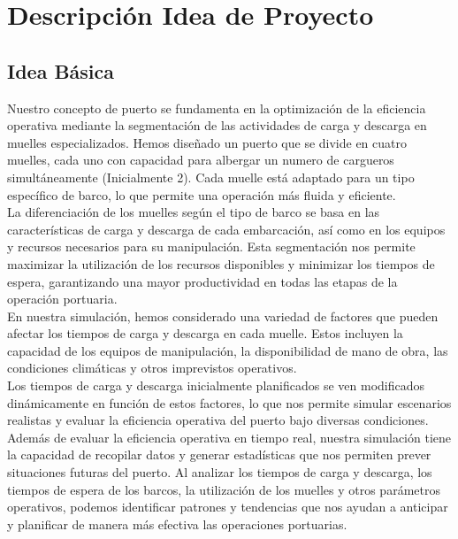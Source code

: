 \documentclass[12pt]{article}
\begin{document}
\begin{center}
   \renewcommand{\contentsname}{Indice de Contenidos}
    \tableofcontents 
\end{center}

\pagebreak


\section{Descripción Idea de Proyecto}
       \subsection{Idea Básica}
        Nuestro concepto de puerto se fundamenta en la optimización de la eficiencia operativa mediante la segmentación de las actividades de carga y descarga en muelles especializados. Hemos diseñado un puerto que se divide en cuatro muelles, cada uno con capacidad para albergar un numero de cargueros simultáneamente (Inicialmente 2). Cada muelle está adaptado para un tipo específico de barco, lo que permite una operación más fluida y eficiente.\\

        La diferenciación de los muelles según el tipo de barco se basa en las características de carga y descarga de cada embarcación, así como en los equipos y recursos necesarios para su manipulación. Esta segmentación nos permite maximizar la utilización de los recursos disponibles y minimizar los tiempos de espera, garantizando una mayor productividad en todas las etapas de la operación portuaria.\\

        En nuestra simulación, hemos considerado una variedad de factores que pueden afectar los tiempos de carga y descarga en cada muelle. Estos incluyen la capacidad de los equipos de manipulación, la disponibilidad de mano de obra, las condiciones climáticas y otros imprevistos operativos.\\

        Los tiempos de carga y descarga inicialmente planificados se ven modificados dinámicamente en función de estos factores, lo que nos permite simular escenarios realistas y evaluar la eficiencia operativa del puerto bajo diversas condiciones. \\

        Además de evaluar la eficiencia operativa en tiempo real, nuestra simulación tiene la capacidad de recopilar datos y generar estadísticas que nos permiten prever situaciones futuras del puerto. Al analizar los tiempos de carga y descarga, los tiempos de espera de los barcos, la utilización de los muelles y otros parámetros operativos, podemos identificar patrones y tendencias que nos ayudan a anticipar y planificar de manera más efectiva las operaciones portuarias.\\
\end{document}
